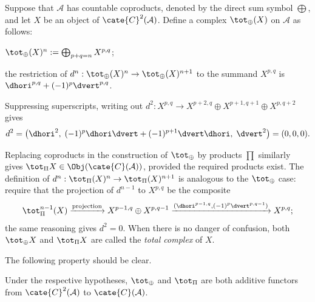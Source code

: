 \begin{definition}\label{def:total-cplx}
	Suppose that $\mathcal{A}$ has countable coproducts, denoted by the direct
	sum symbol $\bigoplus$, and let $X$ be an object of
	$\cate{C}^2(\mathcal{A})$. Define a complex $\tot_{\oplus}(X)$ on
	$\mathcal{A}$ as follows:
	\begin{compactitem}
		\item $\tot_{\oplus}(X)^n := \bigoplus_{p+q=n} X^{p, q}$;
		\item the restriction of $d^n:\tot_{\oplus}(X)^n\to
		\tot_{\oplus}(X)^{n+1}$ to the summand $X^{p,q}$ is
		$\dhori^{p,q}+(-1)^p\dvert^{p,q}$.
	\end{compactitem}
\end{definition}

Suppressing superscripts, writing out
$d^2:X^{p,q}\to X^{p+2,q}\oplus X^{p+1,q+1}\oplus X^{p,q+2}$ gives
\[ d^2 = \left( \dhori^2, \; (-1)^p \dhori \dvert + (-1)^{p+1} \dvert \dhori , \; \dvert^2 \right) = (0, 0, 0). \]

Replacing coproducts in the construction of $\tot_{\oplus}$ by products
$\prod$ similarly gives
$\tot_{\Pi}X\in\Obj(\cate{C}(\mathcal{A}))$, provided the required products
exist. The definition of
$d^n:\tot_{\Pi}(X)^n\to\tot_{\Pi}(X)^{n+1}$ is analogous to the
$\tot_{\oplus}$ case: require that the projection of $d^{n-1}$ to
$X^{p,q}$ be the composite
\[ \tot_{\Pi}^{n-1}(X) \xrightarrow{\text{projection}} X^{p-1, q} \oplus X^{p,q-1} \xrightarrow{(\dhori^{p-1, q}, (-1)^p \dvert^{p, q-1})} X^{p, q}; \]
the same reasoning gives $d^2=0$. When there is no danger of confusion,
both $\tot_{\oplus}X$ and $\tot_{\Pi}X$ are called the \emph{total
complex} of $X$.

The following property should be clear.

\begin{proposition}
	Under the respective hypotheses, $\tot_{\oplus}$ and $\tot_{\Pi}$ are
	both additive functors from $\cate{C}^2(\mathcal{A})$ to
	$\cate{C}(\mathcal{A})$.
\end{proposition}

